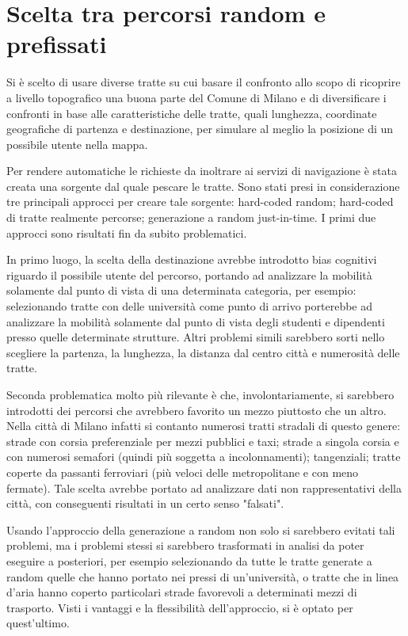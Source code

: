 \section{Scelta tra percorsi random e prefissati}

Si è scelto di usare diverse tratte su cui basare il confronto allo scopo di ricoprire a livello topografico una buona parte del Comune di Milano e di diversificare i confronti in base alle caratteristiche delle tratte, quali lunghezza, coordinate geografiche di partenza e destinazione, per simulare al meglio la posizione di un possibile utente nella mappa.

Per rendere automatiche le richieste da inoltrare ai servizi di navigazione è stata creata una sorgente dal quale pescare le tratte. Sono stati presi in considerazione tre principali approcci per creare tale sorgente: hard-coded random; hard-coded di tratte realmente percorse; generazione a random just-in-time. I primi due approcci sono risultati fin da subito problematici.

In primo luogo, la scelta della destinazione avrebbe introdotto bias cognitivi riguardo il possibile utente del percorso, portando ad analizzare la mobilità solamente dal punto di vista di una determinata categoria, per esempio: selezionando tratte con delle università come punto di arrivo porterebbe ad analizzare la mobilità solamente dal punto di vista degli studenti e dipendenti presso quelle determinate strutture. Altri problemi simili sarebbero sorti nello scegliere la partenza, la lunghezza, la distanza dal centro città e numerosità delle tratte.

Seconda problematica molto più rilevante è che, involontariamente, si sarebbero introdotti dei percorsi che avrebbero favorito un mezzo piuttosto che un altro. Nella città di Milano infatti si contanto numerosi tratti stradali di questo genere: strade con corsia preferenziale per mezzi pubblici e taxi; strade a singola corsia e con numerosi semafori (quindi più soggetta a incolonnamenti); tangenziali; tratte coperte da passanti ferroviari (più veloci delle metropolitane e con meno fermate). Tale scelta avrebbe portato ad analizzare dati non rappresentativi della città, con conseguenti risultati in un certo senso "falsati".

Usando l'approccio della generazione a random non solo si sarebbero evitati tali problemi, ma i problemi stessi si sarebbero trasformati in analisi da poter eseguire a posteriori, per esempio selezionando da tutte le tratte generate a random quelle che hanno portato nei pressi di un'università, o tratte che in linea d'aria hanno coperto particolari strade favorevoli a determinati mezzi di trasporto. Visti i vantaggi e la flessibilità dell'approccio, si è optato per quest'ultimo.

